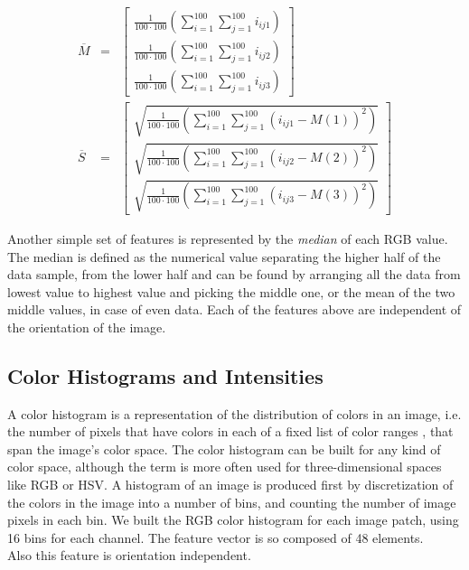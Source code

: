\begin{eqnarray}
 \overline{M} & = & \left[ \begin{array}{c}
                            \frac{1}{100\cdot100} \left( \sum_{i=1}^{100} \sum_{j=1}^{100} i_{ij1} \right) \\
                            \frac{1}{100\cdot100} \left( \sum_{i=1}^{100} \sum_{j=1}^{100} i_{ij2} \right) \\
                            \frac{1}{100\cdot100} \left( \sum_{i=1}^{100} \sum_{j=1}^{100} i_{ij3} \right)
                           \end{array} \right] \\
 \overline{S} & = & \left[ \begin{array}{c}
                                 \sqrt{\frac{1}{100\cdot100} \left( \sum_{i=1}^{100} \sum_{j=1}^{100} (i_{ij1} - M(1) )^2 \right)} \\
                                 \sqrt{\frac{1}{100\cdot100} \left( \sum_{i=1}^{100} \sum_{j=1}^{100} (i_{ij2} - M(2) )^2 \right)} \\
                                 \sqrt{\frac{1}{100\cdot100} \left( \sum_{i=1}^{100} \sum_{j=1}^{100} (i_{ij3} - M(3) )^2 \right)}
                                \end{array}  \right]
\end{eqnarray}

Another simple set of features is represented by the \textit{median} of each \Gls{RGB} value. The median is defined as the numerical value separating the higher half of the data sample, from the lower half
and can be found by arranging all the data from lowest value to highest value and picking the middle one, or the mean of the two middle values, in case of even data.
Each of the features above are independent of the orientation of the image.



\vspace{0.5cm}

\subsection{Color Histograms and Intensities}

A color histogram is a representation of the distribution of colors in an image, i.e. the number of pixels that have colors in each of a fixed list of color ranges \cite{colorHistogram01},
that span the image's color space. The color histogram can be built for any kind of color space, although the term is more often used for three-dimensional spaces like \Gls{RGB} or \Gls{HSV}.
A histogram of an image is produced first by discretization of the colors in the image into a number of bins, and counting the number of image pixels in each bin.
We built the \Gls{RGB} color histogram for each image patch, using 16 bins for each channel. The feature vector is so composed of 48 elements.\\
Also this feature is orientation independent.


